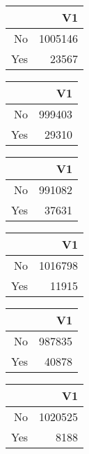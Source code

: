 \bigskip\bigskip
\centering
\begin{tabular}{rr}
  \hline
 & V1 \\ 
  \hline
No & 1005146 \\ 
  Yes & 23567 \\ 
   \hline
\end{tabular}

\bigskip\bigskip
\centering
\begin{tabular}{rr}
  \hline
 & V1 \\ 
  \hline
No & 999403 \\ 
  Yes & 29310 \\ 
   \hline
\end{tabular}

\bigskip\bigskip
\centering
\begin{tabular}{rr}
  \hline
 & V1 \\ 
  \hline
No & 991082 \\ 
  Yes & 37631 \\ 
   \hline
\end{tabular}

\bigskip\bigskip
\centering
\begin{tabular}{rr}
  \hline
 & V1 \\ 
  \hline
No & 1016798 \\ 
  Yes & 11915 \\ 
   \hline
\end{tabular}

\bigskip\bigskip
\centering
\begin{tabular}{rr}
  \hline
 & V1 \\ 
  \hline
No & 987835 \\ 
  Yes & 40878 \\ 
   \hline
\end{tabular}

\bigskip\bigskip
\centering
\begin{tabular}{rr}
  \hline
 & V1 \\ 
  \hline
No & 1020525 \\ 
  Yes & 8188 \\ 
   \hline
\end{tabular}

